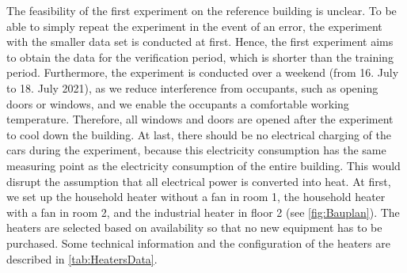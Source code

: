 The feasibility of the first experiment on the reference building is unclear. To be able to simply repeat the experiment in the event of an error, the experiment with the smaller data set is conducted at first. Hence, the first experiment aims to obtain the data for the verification period, which is shorter than the training period. Furthermore, the experiment is conducted over a weekend (from 16. July to 18. July 2021), as we reduce interference from occupants, such as opening doors or windows, and we enable the occupants a comfortable working temperature. Therefore, all windows and doors are opened after the experiment to cool down the building. At last, there should be no electrical charging of the cars during the experiment, because this electricity consumption has the same measuring point as the electricity consumption of the entire building. This would disrupt the assumption that all electrical power is converted into heat.\newline
At first, we set up the household heater without a fan in room 1, the household heater with a fan in room 2, and the industrial heater in floor 2 (see \autoref{fig:Bauplan}). The heaters are selected based on availability so that no new equipment has to be purchased. Some technical information and the configuration of the heaters are described in \autoref{tab:HeatersData}.

